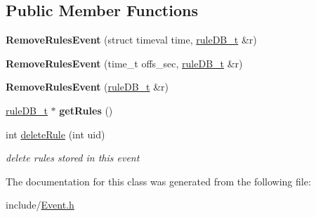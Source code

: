 \subsection*{Public Member Functions}
\begin{DoxyCompactItemize}
\item 
\mbox{\label{classRemoveRulesEvent_adf584666f47248f32fbbc2f1ebb9a313}} 
{\bfseries Remove\+Rules\+Event} (struct timeval time, \hyperlink{RuleFileParser_8h_a7d5bb94bb17a8a1d92db2a89a0cc96d1}{rule\+D\+B\+\_\+t} \&r)
\item 
\mbox{\label{classRemoveRulesEvent_a7b3978a65ad21408bb5f1aa2e0650e17}} 
{\bfseries Remove\+Rules\+Event} (time\+\_\+t offs\+\_\+sec, \hyperlink{RuleFileParser_8h_a7d5bb94bb17a8a1d92db2a89a0cc96d1}{rule\+D\+B\+\_\+t} \&r)
\item 
\mbox{\label{classRemoveRulesEvent_a00390e2cc409267037a13b42cf58bda5}} 
{\bfseries Remove\+Rules\+Event} (\hyperlink{RuleFileParser_8h_a7d5bb94bb17a8a1d92db2a89a0cc96d1}{rule\+D\+B\+\_\+t} \&r)
\item 
\mbox{\label{classRemoveRulesEvent_aa0c839f29fc8421273128d261b2cea01}} 
\hyperlink{RuleFileParser_8h_a7d5bb94bb17a8a1d92db2a89a0cc96d1}{rule\+D\+B\+\_\+t} $\ast$ {\bfseries get\+Rules} ()
\item 
\mbox{\label{classRemoveRulesEvent_aaf5e445b04a07dd2129d80e03ba43538}} 
int \hyperlink{classRemoveRulesEvent_aaf5e445b04a07dd2129d80e03ba43538}{delete\+Rule} (int uid)
\begin{DoxyCompactList}\small\item\em delete rules stored in this event \end{DoxyCompactList}\end{DoxyCompactItemize}


The documentation for this class was generated from the following file\+:\begin{DoxyCompactItemize}
\item 
include/\hyperlink{Event_8h}{Event.\+h}\end{DoxyCompactItemize}
